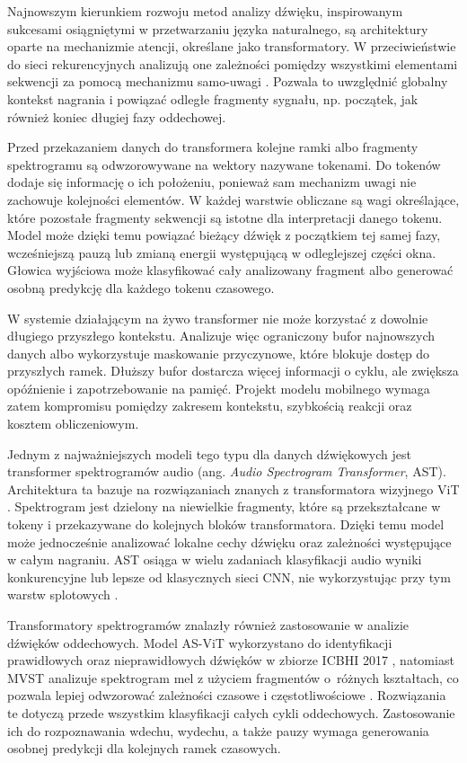 Najnowszym kierunkiem rozwoju metod analizy dźwięku, inspirowanym sukcesami osiągniętymi w przetwarzaniu języka naturalnego, są architektury oparte na mechanizmie atencji, określane jako transformatory. W przeciwieństwie do sieci rekurencyjnych analizują one zależności pomiędzy wszystkimi elementami sekwencji za pomocą mechanizmu samo-uwagi \cite{vaswani2017attention}. Pozwala to uwzględnić globalny kontekst nagrania i powiązać odległe fragmenty sygnału, np. początek, jak również koniec długiej fazy oddechowej.

Przed przekazaniem danych do transformera kolejne ramki albo fragmenty spektrogramu są odwzorowywane na wektory nazywane tokenami. Do tokenów dodaje się informację o ich położeniu, ponieważ sam mechanizm uwagi nie zachowuje kolejności elementów. W każdej warstwie obliczane są wagi określające, które pozostałe fragmenty sekwencji są istotne dla interpretacji danego tokenu. Model może dzięki temu powiązać bieżący dźwięk z początkiem tej samej fazy, wcześniejszą pauzą lub zmianą energii występującą w odleglejszej części okna. Głowica wyjściowa może klasyfikować cały analizowany fragment albo generować osobną predykcję dla każdego tokenu czasowego.

W systemie działającym na żywo transformer nie może korzystać z dowolnie długiego przyszłego kontekstu. Analizuje więc ograniczony bufor najnowszych danych albo wykorzystuje maskowanie przyczynowe, które blokuje dostęp do przyszłych ramek. Dłuższy bufor dostarcza więcej informacji o cyklu, ale zwiększa opóźnienie i zapotrzebowanie na pamięć. Projekt modelu mobilnego wymaga zatem kompromisu pomiędzy zakresem kontekstu, szybkością reakcji oraz kosztem obliczeniowym.

Jednym z najważniejszych modeli tego typu dla danych dźwiękowych jest transformer spektrogramów audio (ang. \textit{Audio Spectrogram Transformer}, AST). Architektura ta bazuje na rozwiązaniach znanych z transformatora wizyjnego ViT \cite{dosovitskiy2021vit}. Spektrogram jest dzielony na niewielkie fragmenty, które są przekształcane w tokeny i przekazywane do kolejnych bloków transformatora. Dzięki temu model może jednocześnie analizować lokalne cechy dźwięku oraz zależności występujące w całym nagraniu. AST osiąga w wielu zadaniach klasyfikacji audio wyniki konkurencyjne lub lepsze od klasycznych sieci CNN, nie wykorzystując przy tym warstw splotowych \cite{gong2021ast}.

Transformatory spektrogramów znalazły również zastosowanie w analizie dźwięków oddechowych. Model AS-ViT wykorzystano do identyfikacji prawidłowych oraz nieprawidłowych dźwięków w zbiorze ICBHI 2017 \cite{ariyanti2023asvit}, natomiast MVST analizuje spektrogram mel z użyciem fragmentów o~różnych kształtach, co pozwala lepiej odwzorować zależności czasowe i częstotliwościowe \cite{he2024mvst}. Rozwiązania te dotyczą przede wszystkim klasyfikacji całych cykli oddechowych. Zastosowanie ich do rozpoznawania wdechu, wydechu, a także pauzy wymaga generowania osobnej predykcji dla kolejnych ramek czasowych.

